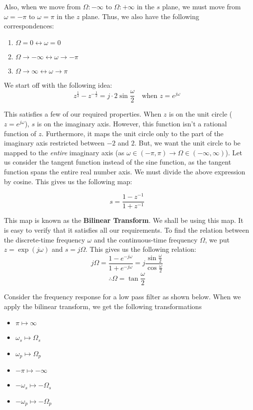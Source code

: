 \documentclass{article}
\theoremstyle{definition}
\begin{document}
Also, when we move from $\Omega : -\infty$ to $\Omega : +\infty$ in the $s$ plane, we must move from $\omega = -\pi$ to $\omega = \pi$ in the $z$ plane. Thus, we also have the following correspondences:

\begin{enumerate}
    \item $\Omega = 0 \longleftrightarrow \omega = 0$
    \item $\Omega \rightarrow -\infty \longleftrightarrow \omega \rightarrow -\pi$ 
    \item $\Omega \rightarrow \infty \longleftrightarrow \omega \rightarrow \pi$ 
\end{enumerate}

We start off with the following idea:
\[
    z^{\frac{1}{2}} - z^{-\frac{1}{2}} = j \cdot 2 \sin{\frac{\omega}{2}} \quad \text{when } z = e^{j\omega}
\]

This satisfies a few of our required properties. When $z$ is on the unit circle ($z = e^{j\omega}$), $s$ is on the imaginary axis. However, this function isn't a rational function of $z$. Furthermore, it maps the unit circle only to the part of the imaginary axis restricted between $-2$ and $2$. But, we want the unit circle to be mapped to the \textit{entire} imaginary axis (as $\omega \in (-\pi, \pi) \rightarrow \Omega \in (-\infty, \infty)$). Let us consider the tangent function instead of the sine function, as the tangent function spans the entire real number axis. We must divide the above expression by cosine. This gives us the following map:

\[
    \boxed{s = \frac{1 - z^{-1}}{1 + z^{-1}}}
\]

This map is known as the \textbf{Bilinear Transform}. We shall be using this map. It is easy to verify that it satisfies all our requirements. To find the relation between the discrete-time frequency $\omega$ and the continuous-time frequency $\Omega$, we put $z = \exp(j\omega)$ and $s = j \Omega$. This gives us the following relation:
\[
    j\Omega = \frac{1 - e^{-j\omega}}{1 + e^{-j\omega}} = j \frac{\sin \frac{\omega}{2}}{\cos \frac{\omega}{2}}
\]
\[
    \therefore \boxed{\Omega = \tan \frac{\omega}{2}}
\]

Consider the frequency response for a low pass filter as shown below. When we apply the bilinear transform, we get the following transformations
\begin{itemize}
    \item $\pi \longmapsto \infty$
    \item $\omega_s \longmapsto \Omega_s$
    \item $\omega_p \longmapsto \Omega_p$
    \item $-\pi \longmapsto -\infty$
    \item $-\omega_s \longmapsto -\Omega_s$
    \item $-\omega_p \longmapsto -\Omega_p$
\end{itemize}
\end{document}
